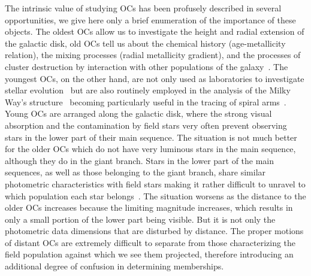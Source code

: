 \documentclass{aa}
\begin{document}
 The intrinsic value of studying OCs has been profusely described in several
 opportunities, we  give here only a brief enumeration of the importance
 of these objects. The oldest OCs
 allow us to investigate the height and radial extension of the galactic disk,
 old OCs tell us about the chemical history (age-metallicity relation), the
 mixing processes (radial metallicity gradient), and the processes of cluster
 destruction by interaction with other populations of the
 galaxy~\citep{Friel1995,Tosi_2004,Lamers_2005}.
 The youngest OCs, on the other hand, are not only used as laboratories to
 investigate stellar evolution~\citep[they allow studying in detail the boundary
 conditions necessary to create new generations of stars, ][]{Lada2003} but are
 also routinely employed in the analysis of the Milky Way's
 structure~\citep{Loktin_1992,Moitinho_2006,Vazquez2008,Moitinho_2010}
 becoming particularly useful in the tracing of spiral
 arms~\citep{carraro_2013,Molina_2018}.
 Young OCs are arranged along the galactic disk, where the strong visual
 absorption and the contamination by field stars very often prevent observing
 stars in the lower part of their main sequence.
 The situation is not much better for the older OCs which do not
 have very luminous stars in the main sequence, although they do in the giant
 branch. Stars in the lower part of the main sequences, as well as those
 belonging to the giant branch, share similar photometric characteristics with
 field stars making it rather difficult to unravel to which population each star
 belongs~\citep{Hayes_2015}.
 The situation worsens as the distance to the older OCs increases because the
 limiting magnitude increases, which results in only a small portion of
 the lower part being visible. But it is not only the photometric
 data dimensions that are disturbed by distance. The proper
 motions of distant OCs are
 extremely difficult to separate from those characterizing the field
 population against which we see them projected, therefore introducing an
 additional degree of confusion in determining memberships.
\end{document}

